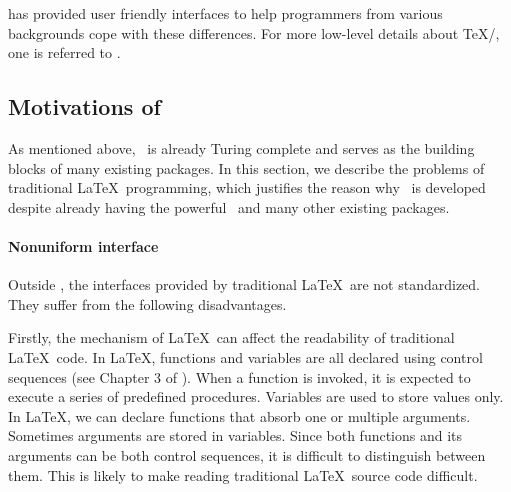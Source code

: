 \documentclass{ltugboat}
\begin{document}
\LTT{} has provided user friendly interfaces to help \LT{} programmers from various backgrounds cope with these differences.
For more low-level details about \TeX{}/\LT{}, one is referred to \cite{knuth1984texbook,berry2017latex}.

\subsection{Motivations of \liii}

As mentioned above, \LaTeXe~is already Turing complete and serves as the building blocks of many existing packages. In this section, we describe the problems of traditional \LaTeX~programming, which justifies the reason why \liii~is developed despite already having the powerful \LaTeXe~and many other existing packages.

\paragraph{Nonuniform interface} 

Outside \liii, the interfaces provided by traditional \LaTeX~are not standardized. They suffer from the following disadvantages.


Firstly, the mechanism of \LaTeX~can affect the readability of traditional \LaTeX~code. 
In \LaTeX, functions and variables are all declared using control sequences (see Chapter 3 of \cite{knuth1984texbook}).
When a function is invoked, it is expected to execute a series of predefined procedures. Variables are used to store values only.
In \LaTeX, we can declare functions that absorb one or multiple arguments.
Sometimes arguments are stored in variables.
Since both functions and its arguments can be both control sequences, it is difficult to distinguish between them. 
This is likely to make reading traditional \LaTeX\ source code difficult.
\end{document}
